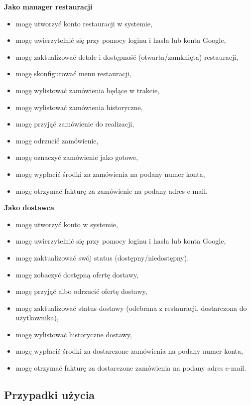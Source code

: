 \medskip

\textbf{Jako manager restauracji}
\begin{itemize}
    \item mogę utworzyć konto restauracji w systemie,
    \item mogę uwierzytelnić się przy pomocy loginu i hasła lub konta Google,
    \item mogę zaktualizować detale i dostępność (otwarta/zamknięta) restauracji,
    \item mogę skonfigurować menu restauracji,
    \item mogę wylistować zamówienia będące w trakcie,
    \item mogę wylistować zamówienia historyczne,
    \item mogę przyjąć zamówienie do realizacji,
    \item mogę odrzucić zamówienie,
    \item mogę oznaczyć zamówienie jako gotowe,
    \item mogę wypłacić środki za zamówienia na podany numer konta,
    \item mogę otrzymać fakturę za zamówienie na podany adres e-mail.
\end{itemize}

\medskip

\textbf{Jako dostawca}
\begin{itemize}
    \item mogę utworzyć konto w systemie,
    \item mogę uwierzytelnić się przy pomocy loginu i hasła lub konta Google,
    \item mogę zaktualizować swój status (dostępny/niedostępny),
    \item mogę zobaczyć dostępną ofertę dostawy,
    \item mogę przyjąć albo odrzucić ofertę dostawy,
    \item mogę zaktualizować status dostawy (odebrana z restauracji, dostarczona do użytkownika),
    \item mogę wylistować historyczne dostawy,
    \item mogę wypłacić środki za dostarczone zamówienia na podany numer konta,
    \item mogę otrzymać fakturę za dostarczone zamówienia na podany adres e-mail.
\end{itemize}

\subsection{Przypadki użycia}

